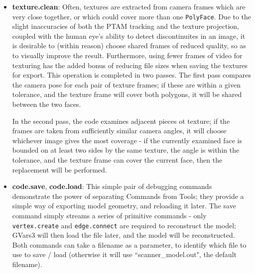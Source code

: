 \documentclass[a4paper,10pt]{article}
\begin{document}
\begin{itemize}
\item{\textbf{texture.clean}: Often, textures are extracted from camera frames which are very close together, or which could cover more than one \texttt{PolyFace}. Due to the slight inaccuracies of both the PTAM tracking and the texture projection, coupled with the human eye's ability to detect discontinuites in an image, it is desirable to (within reason) choose shared frames of reduced quality, so as to visually improve the result. Furthermore, using fewer frames of video for texturing has the added bonus of reducing file sizes when saving the textures for export. This operation is completed in two passes. The first pass compares the camera pose for each pair of texture frames; if these are within a given tolerance, and the texture frame will cover both polygons, it will be shared between the two faces.

In the second pass, the code examines adjacent pieces ot texture; if the frames are taken from sufficiently similar camera angles, it will choose whichever  image gives the most coverage - if the currently examined face is bounded on at least two sides by the same texture, the angle is within the tolerance, and the texture frame can cover the current face, then the replacement will be performed.}
\item{\textbf{code.save}, \textbf{code.load}: This simple pair of debugging commands demonstrate the power of separating Commands from Tools; they provide a simple way of exporting model geometry, and reloading it later. The save command simply streams a series of primitive commands - only \texttt{vertex.create} and \texttt{edge.connect} are required to reconstruct the model; GVars3 will then load the file later, and the model will be reconstructed. Both commands can take a filename as a parameter, to identify which file to use to save / load (otherwise it will use ``scanner\_model.out", the default filename).}


\end{itemize}
\end{document}
